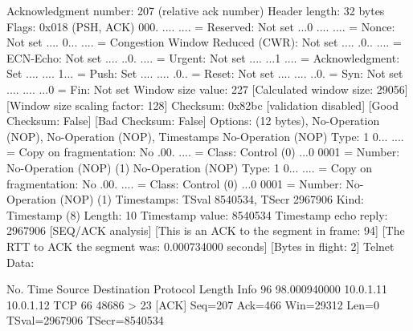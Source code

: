     Acknowledgment number: 207    (relative ack number)
    Header length: 32 bytes
    Flags: 0x018 (PSH, ACK)
        000. .... .... = Reserved: Not set
        ...0 .... .... = Nonce: Not set
        .... 0... .... = Congestion Window Reduced (CWR): Not set
        .... .0.. .... = ECN-Echo: Not set
        .... ..0. .... = Urgent: Not set
        .... ...1 .... = Acknowledgment: Set
        .... .... 1... = Push: Set
        .... .... .0.. = Reset: Not set
        .... .... ..0. = Syn: Not set
        .... .... ...0 = Fin: Not set
    Window size value: 227
    [Calculated window size: 29056]
    [Window size scaling factor: 128]
    Checksum: 0x82bc [validation disabled]
        [Good Checksum: False]
        [Bad Checksum: False]
    Options: (12 bytes), No-Operation (NOP), No-Operation (NOP), Timestamps
        No-Operation (NOP)
            Type: 1
                0... .... = Copy on fragmentation: No
                .00. .... = Class: Control (0)
                ...0 0001 = Number: No-Operation (NOP) (1)
        No-Operation (NOP)
            Type: 1
                0... .... = Copy on fragmentation: No
                .00. .... = Class: Control (0)
                ...0 0001 = Number: No-Operation (NOP) (1)
        Timestamps: TSval 8540534, TSecr 2967906
            Kind: Timestamp (8)
            Length: 10
            Timestamp value: 8540534
            Timestamp echo reply: 2967906
    [SEQ/ACK analysis]
        [This is an ACK to the segment in frame: 94]
        [The RTT to ACK the segment was: 0.000734000 seconds]
        [Bytes in flight: 2]
Telnet
    Data: 

No.     Time           Source                Destination           Protocol Length Info
     96 98.000940000   10.0.1.11             10.0.1.12             TCP      66     48686 > 23 [ACK] Seq=207 Ack=466 Win=29312 Len=0 TSval=2967906 TSecr=8540534

